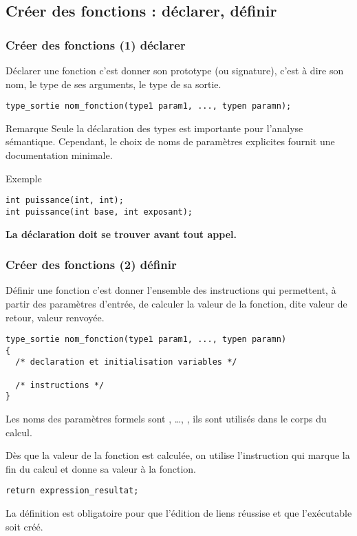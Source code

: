 \documentclass[xcolor=pdftex,svgnames,table]{beamer}
\begin{document}
\subsection{Créer des fonctions : déclarer, définir}
\begin{frame}[fragile]
  \frametitle{Créer des fonctions (1)  déclarer}
Déclarer une fonction c'est donner son prototype (ou signature), c'est
à dire son nom, le type de ses arguments, le type de sa sortie.\pause
\begin{lstlisting}[basicstyle=\ttfamily\scriptsize]
type_sortie nom_fonction(type1 param1, ..., typen paramn);
\end{lstlisting}
\pause
\begin{block}{Remarque}
  Seule la déclaration des types est importante pour
  l'analyse sémantique. Cependant, le choix de noms de paramètres
  explicites fournit une documentation minimale.
\end{block}


\pause
\begin{block}{Exemple}

\begin{lstlisting}[basicstyle=\ttfamily\small]
int puissance(int, int);
int puissance(int base, int exposant);
\end{lstlisting}
\end{block}
\pause
\textbf{La déclaration doit se trouver avant tout appel.}
\end{frame}
\begin{frame}[fragile]
  \frametitle{Créer des fonctions (2)  définir}
\pause
Définir une fonction c'est donner l'ensemble des instructions qui
permettent, à partir des paramètres d'entrée, de calculer la valeur de
la fonction, dite valeur de retour, valeur renvoyée.\pause
\begin{lstlisting}[basicstyle=\ttfamily\scriptsize]
type_sortie nom_fonction(type1 param1, ..., typen paramn)
{
  /* declaration et initialisation variables */

  /* instructions */
}
\end{lstlisting}\pause
Les noms des paramètres
formels sont , \ldots, , ils sont utilisés dans le
corps du calcul.
\pause

Dès que la valeur de la
fonction est calculée, on utilise l'instruction  qui marque
la fin du calcul et donne sa valeur à la fonction. \pause
\begin{lstlisting}[basicstyle=\ttfamily\small]
  return expression_resultat;
\end{lstlisting}

La définition est obligatoire pour que l'édition de liens réussise et que l'exécutable soit créé.
\end{frame}
\end{document}
